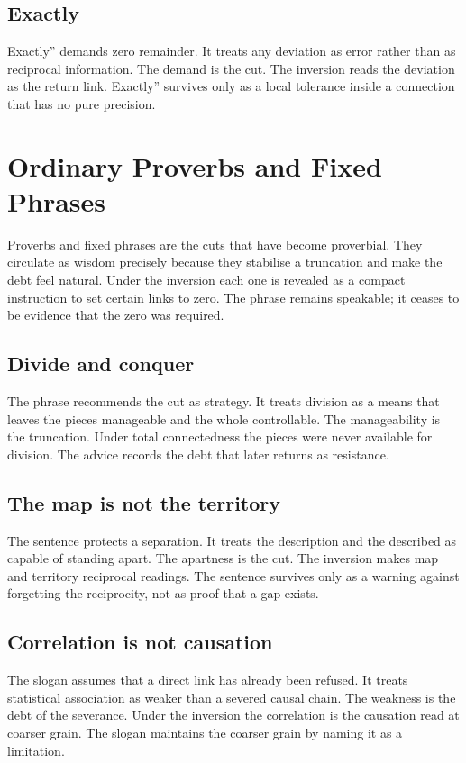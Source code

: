 \documentclass[11pt,a4paper]{article}
\begin{document}
\subsection{Exactly} Exactly'' demands zero remainder. It treats any deviation as error rather than as reciprocal information. The demand is the cut. The inversion reads the deviation as the return link. Exactly'' survives only as a local tolerance inside a connection that has no pure precision.

\section{Ordinary Proverbs and Fixed Phrases}

Proverbs and fixed phrases are the cuts that have become proverbial. They circulate as wisdom precisely because they stabilise a truncation and make the debt feel natural. Under the inversion each one is revealed as a compact instruction to set certain links to zero. The phrase remains speakable; it ceases to be evidence that the zero was required.

\subsection{Divide and conquer} The phrase recommends the cut as strategy. It treats division as a means that leaves the pieces manageable and the whole controllable. The manageability is the truncation. Under total connectedness the pieces were never available for division. The advice records the debt that later returns as resistance.

\subsection{The map is not the territory} The sentence protects a separation. It treats the description and the described as capable of standing apart. The apartness is the cut. The inversion makes map and territory reciprocal readings. The sentence survives only as a warning against forgetting the reciprocity, not as proof that a gap exists.

\subsection{Correlation is not causation} The slogan assumes that a direct link has already been refused. It treats statistical association as weaker than a severed causal chain. The weakness is the debt of the severance. Under the inversion the correlation is the causation read at coarser grain. The slogan maintains the coarser grain by naming it as a limitation.
\end{document}
